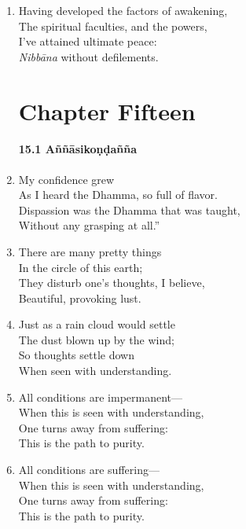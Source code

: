\documentclass[10pt, openany]{book}
\newcommand*{\vleftofline}[1]{\leavevmode\llap{#1}}
\begin{document}
\begin{enumerate}
\item Having developed the factors of awakening,\\
The spiritual faculties, and the powers,\\
I’ve attained ultimate peace:\\
\emph{Nibbāna} without defilements.

\chapter*{Chapter Fifteen}

\subsubsection*{15.1 Aññāsikoṇḍañña}

\item \vleftofline{“}My confidence grew\\
As I heard the Dhamma, so full of flavor.\\
Dispassion was the Dhamma that was taught,\\
Without any grasping at all.”

\item \vleftofline{“}There are many pretty things\\
In the circle of this earth;\\
They disturb one’s thoughts, I believe,\\
Beautiful, provoking lust.

\item Just as a rain cloud would settle\\
The dust blown up by the wind;\\
So thoughts settle down\\
When seen with understanding.

\item All conditions are impermanent—\\
When this is seen with understanding,\\
One turns away from suffering:\\
This is the path to purity.

\item All conditions are suffering—\\
When this is seen with understanding,\\
One turns away from suffering:\\
This is the path to purity.


\end{enumerate}
\end{document}
